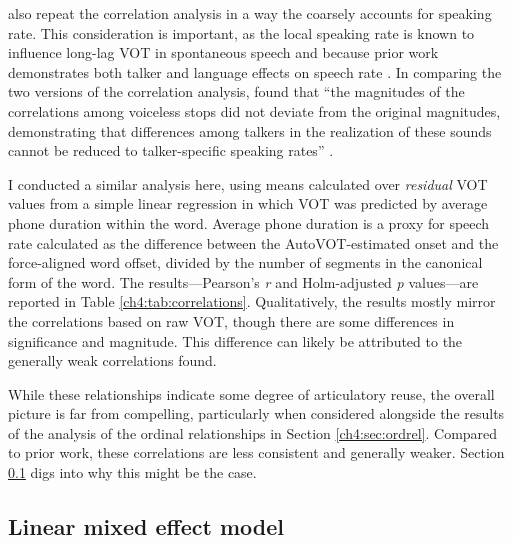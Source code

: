 \citet{chodroff_2017_structure} also repeat the correlation analysis in a way the coarsely accounts for speaking rate. This consideration is important, as the local speaking rate is known to influence long-lag VOT in spontaneous speech \citep{stuartsmith_2015_private} and because prior work demonstrates both talker and language effects on speech rate \citep{bradlow_2017_rate}. In comparing the two versions of the correlation analysis, \citeauthor{chodroff_2017_structure} found that ``the magnitudes of the correlations among voiceless stops did not deviate from the original magnitudes, demonstrating that differences among talkers in the realization of these sounds cannot be reduced to talker-specific speaking rates'' \citeyearpar[][p. 34]{chodroff_2017_structure}. 

I conducted a similar analysis here, using means calculated over \textit{residual} VOT values from a simple linear regression in which VOT was predicted by average phone duration within the word. Average phone duration is a proxy for speech rate calculated as the difference between the AutoVOT-estimated onset and the force-aligned word offset, divided by the number of segments in the canonical form of the word. The results---Pearson's \textit{r} and Holm-adjusted \textit{p} values---are reported in Table \ref{ch4:tab:correlations}. Qualitatively, the results mostly mirror the correlations based on raw VOT, though there are some differences in significance and magnitude. This difference can likely be attributed to the generally weak correlations found. 

While these relationships indicate some degree of articulatory reuse, the overall picture is far from compelling, particularly when considered alongside the results of the analysis of the ordinal relationships in Section \ref{ch4:sec:ordrel}. Compared to prior work, these correlations are less consistent and generally weaker. Section \ref{ch4:sec:lmem} digs into why this might be the case. 


\subsection{Linear mixed effect model}\label{ch4:sec:lmem}

